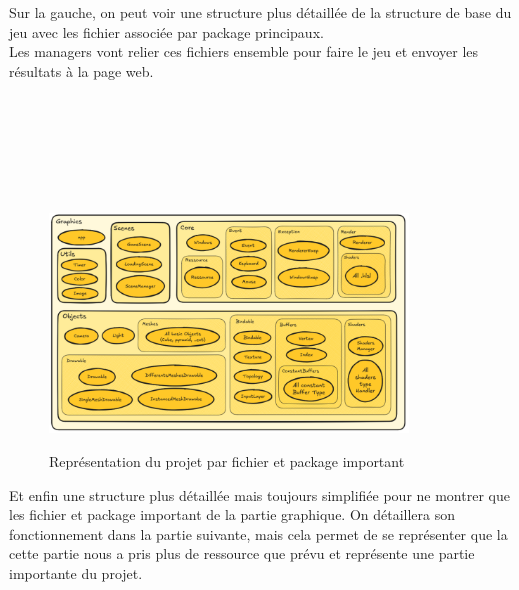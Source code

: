  \\ \\
Sur la gauche, on peut voir une structure plus détaillée de la structure de base du jeu avec les fichier associée par package principaux. \\
Les managers vont relier ces fichiers ensemble pour faire le jeu et envoyer les résultats à la page web. \\ \\ \\ \\ \\ \\ \\

\begin{figure}[h]
	\centering
	\includegraphics[width=0.85\textwidth]{images/ExcalidrawGraphics.png}
	\label{ExcalidrawGraphics}
	\caption{Représentation du projet par fichier et package important}
\end{figure}

Et enfin une structure plus détaillée mais toujours simplifiée pour ne montrer que les fichier et package important de la partie graphique. 
On détaillera son fonctionnement dans la partie suivante, mais cela permet de se représenter que la cette partie nous a pris plus de ressource que prévu et représente une partie importante du projet.



